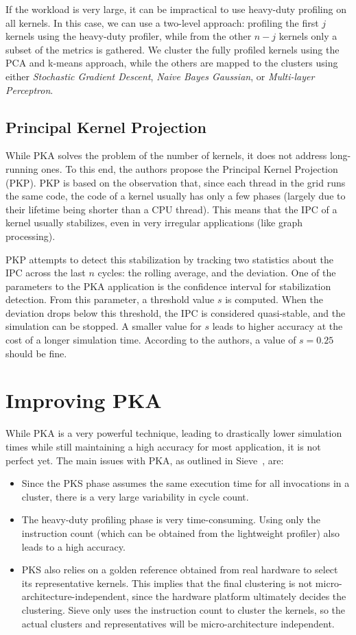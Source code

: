 If the workload is very large, it can be impractical to use heavy-duty profiling on all kernels.
In this case, we can use a two-level approach: profiling the first $j$ kernels using the heavy-duty profiler, while from the other $n - j$ kernels only a subset of the metrics is gathered.
We cluster the fully profiled kernels using the PCA and k-means approach, while the others are mapped to the clusters using either \textit{Stochastic Gradient Descent}, \textit{Naive Bayes Gaussian}, or \textit{Multi-layer Perceptron}.

\subsection{Principal Kernel Projection}\label{subsec:pkp}
While PKA solves the problem of the number of kernels, it does not address long-running ones.
To this end, the authors propose the Principal Kernel Projection (PKP).
PKP is based on the observation that, since each thread in the grid runs the same code, the code of a kernel usually has only a few phases (largely due to their lifetime being shorter than a CPU thread).
This means that the IPC of a kernel usually stabilizes, even in very irregular applications (like graph processing).

PKP attempts to detect this stabilization by tracking two statistics about the IPC across the last $n$ cycles: the rolling average, and the deviation.
One of the parameters to the PKA application is the confidence interval for stabilization detection.
From this parameter, a threshold value $s$ is computed.
When the deviation drops below this threshold, the IPC is considered quasi-stable, and the simulation can be stopped.
A smaller value for $s$ leads to higher accuracy at the cost of a longer simulation time.
According to the authors, a value of $s = 0.25$ should be fine.

\section{Improving PKA}\label{sec:improving-pka-sieve}
While PKA is a very powerful technique, leading to drastically lower simulation times while still maintaining a high accuracy for most application, it is not perfect yet.
The main issues with PKA, as outlined in Sieve~\cite{sieve}, are:
\begin{itemize}
    \item Since the PKS phase assumes the same execution time for all invocations in a cluster, there is a very large variability in cycle count.
    \item The heavy-duty profiling phase is very time-consuming.
    Using only the instruction count (which can be obtained from the lightweight profiler) also leads to a high accuracy.
    \item PKS also relies on a golden reference obtained from real hardware to select its representative kernels.
    This implies that the final clustering is not micro-architecture-independent, since the hardware platform ultimately decides the clustering.
    Sieve only uses the instruction count to cluster the kernels, so the actual clusters and representatives will be micro-architecture independent.
\end{itemize}

